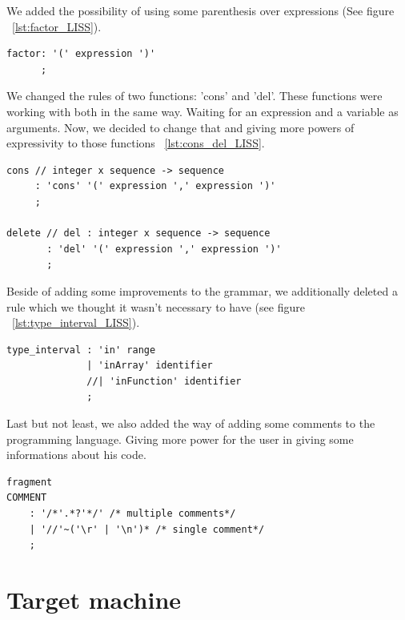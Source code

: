 \documentclass[
  oneside,
  11pt, a4paper,
  footinclude=true,
  headinclude=true,
  cleardoublepage=empty
]{scrbook}
\begin{document}
We added the possibility of using some parenthesis over expressions (See figure ~\ref{lst:factor_LISS}).

\begin{lstlisting}[caption={Rule factor},label={lst:factor_LISS}]
factor: '(' expression ')'
      ;
\end{lstlisting}

We changed the rules of two functions: 'cons' and 'del'. These functions were working with both in the same way. Waiting for an expression and a variable as arguments. Now, we decided to change that and giving more powers of expressivity to those functions ~\ref{lst:cons_del_LISS}.

\begin{lstlisting}[caption={Rule cons and delete},label={lst:cons_del_LISS}]
cons // integer x sequence -> sequence
     : 'cons' '(' expression ',' expression ')'
     ;

delete // del : integer x sequence -> sequence
       : 'del' '(' expression ',' expression ')'
       ;
\end{lstlisting}

Beside of adding some improvements to the grammar, we additionally deleted a rule which we thought it wasn't necessary to have (see figure ~\ref{lst:type_interval_LISS}).
\begin{lstlisting}[caption={Rule type interval},label={lst:type_interval_LISS}]
type_interval : 'in' range
              | 'inArray' identifier
              //| 'inFunction' identifier
              ;
\end{lstlisting}

Last but not least, we also added the way of adding some comments to the programming language. Giving more power for the user in giving some informations about his code.

\begin{lstlisting}[caption={Rule comment},label={lst:comments_LISS}]
fragment
COMMENT
    : '/*'.*?'*/' /* multiple comments*/
    | '//'~('\r' | '\n')* /* single comment*/
    ;
\end{lstlisting}


\chapter{Target machine}
\end{document}
